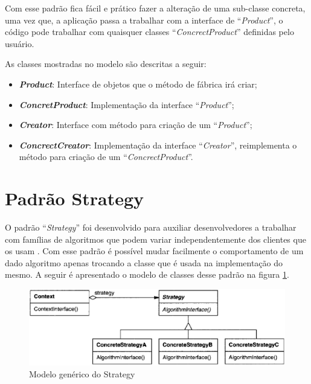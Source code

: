\begin{apendicesenv}
Com esse padrão fica fácil e prático fazer a alteração de uma sub-classe concreta, uma vez que, a aplicação passa a trabalhar com a interface de ``\textit{Product}'', o código pode trabalhar com quaisquer classes ``\textit{ConcrectProduct}'' definidas pelo usuário.

As classes mostradas no modelo são descritas a seguir:

\begin{itemize}
	\item \textbf{\textit{Product}}: Interface de objetos que o método de fábrica irá criar;
	\item \textbf{\textit{ConcretProduct}}: Implementação da interface ``\textit{Product}'';
	\item \textbf{\textit{Creator}}: Interface com método para criação de um ``\textit{Product}'';
	\item \textbf{\textit{ConcrectCreator}}: Implementação da interface ``\textit{Creator}'', reimplementa o método para criação de um ``\textit{ConcrectProduct}''.
\end{itemize}

\section{Padrão Strategy}
\label{sec:padrao_strategy}

O padrão ``\textit{Strategy}'' foi desenvolvido para auxiliar desenvolvedores a trabalhar com famílias de algoritmos que podem variar independentemente dos clientes que os usam \cite{Gamma:1995}. Com esse padrão é possível mudar facilmente o comportamento de um dado algoritmo apenas trocando a classe que é usada na implementação do mesmo. A seguir é apresentado o modelo de classes desse padrão na figura \ref{strategy}.

\newpage
\begin{figure}[!h]
	\centering
	\includegraphics[scale=0.5]{figuras/apendices/strategy.eps}
	\caption[Modelo genérico do Strategy]{Modelo genérico do Strategy \cite{Gamma:1995}}
	\label{strategy}
\end{figure}


\end{apendicesenv}
